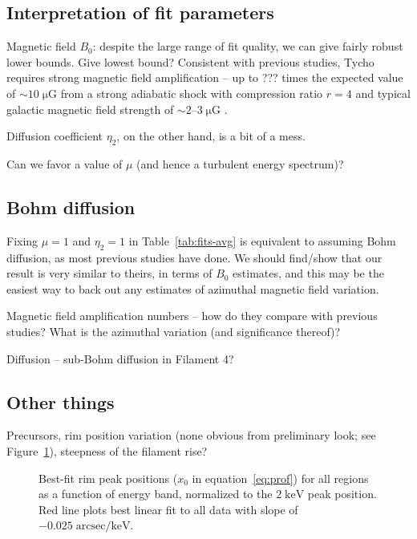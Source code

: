 \documentclass[iop, apj, numberedappendix, twocolappendix]{emulateapj}
\newcommand*{\mt}{\mathrm}
\newcommand*{\unit}[1]{\;\mt{#1}}  %
\newcommand*{\abt}{\mathord{\sim}} %
\begin{document}
\subsection{Interpretation of fit parameters}

Magnetic field $B_0$: despite the large range of fit quality, we can give
fairly robust lower bounds.  Give lowest bound?  Consistent with previous
studies, Tycho requires strong magnetic field amplification -- up to ??? times
the expected value of $\abt 10 \unit{\mu G}$ from a strong adiabatic shock with
compression ratio $r=4$ and typical galactic magnetic field strength of $\abt
2$--$3 \unit{\mu G}$ \citep{lyne1989, han2006}.

Diffusion coefficient $\eta_2$, on the other hand, is a bit of a mess.

Can we favor a value of $\mu$ (and hence a turbulent energy spectrum)?

\subsection{Bohm diffusion}

Fixing $\mu = 1$ and $\eta_2 = 1$ in Table~\ref{tab:fits-avg} is equivalent to
assuming Bohm diffusion, as most previous studies have done.
We should find/show that our result is very similar to theirs, in terms of
$B_0$ estimates, and this may be the easiest way to back out any estimates of
azimuthal magnetic field variation.

Magnetic field amplification numbers -- how do they compare with previous
studies?  What is the azimuthal variation (and significance thereof)?

Diffusion -- sub-Bohm diffusion in Filament 4?

\subsection{Other things}

Precursors, rim position variation (none obvious from preliminary look; see
Figure~\ref{fig:peak-pos}), steepness of the filament rise?

\begin{figure}
    \centering
    \caption{Best-fit rim peak positions ($x_0$ in equation~\eqref{eq:prof})
        for all regions as a function of energy band, normalized to the $2
        \unit{keV}$ peak position.  Red line plots best linear fit to all data
        with slope of $-0.025 \unit{arcsec/keV}$.
        \label{fig:peak-pos}}
\end{figure}
\end{document}
